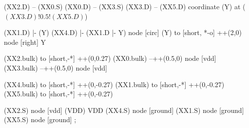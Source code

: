 \begin{circuitikz}[american]
	(XX2.D) -- (XX0.S)
	(XX0.D) -- (XX3.S)
	(XX3.D) -- (XX5.D)
	coordinate (Y) at ($(XX3.D)!0.5!(XX5.D)$)
	
	(XX1.D) |- (Y)
	(XX4.D) |- (XX1.D |- Y) node [circ] {}
	(Y) to [short, *-o] ++(2,0) node [right] {Y}
	
	(XX2.bulk) to [short,-*] ++(0,0.27)
	(XX0.bulk) --++(0.5,0) node [vdd] {}
	(XX3.bulk) --++(0.5,0) node [vdd] {}
	
	(XX4.bulk) to [short,-*] ++(0,-0.27)
	(XX1.bulk) to [short,-*] ++(0,-0.27)
	(XX5.bulk) to [short,-*] ++(0,-0.27)


	(XX2.S) node [vdd] (VDD) {VDD}
	(XX4.S) node [ground] {}
	(XX1.S) node [ground] {}
	(XX5.S) node [ground] {}
;

\end{circuitikz}
